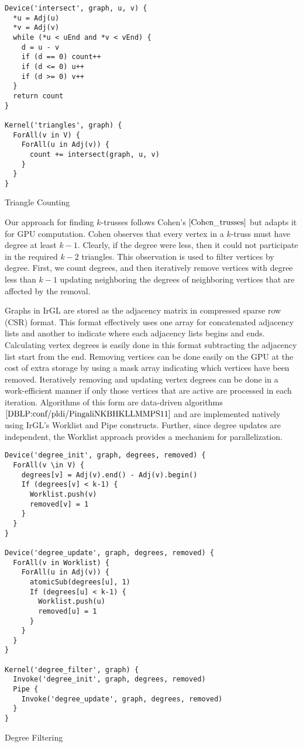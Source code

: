 \documentclass[conference]{IEEEtran}
\begin{document}
\begin{listing}
\begin{verbatim}
Device('intersect', graph, u, v) {
  *u = Adj(u)
  *v = Adj(v)
  while (*u < uEnd and *v < vEnd) {
    d = u - v
    if (d == 0) count++
    if (d <= 0) u++
    if (d >= 0) v++
  }
  return count
}

Kernel('triangles', graph) {
  ForAll(v in V) {
    ForAll(u in Adj(v)) {
      count += intersect(graph, u, v)
    }
  }
}
\end{verbatim}
\caption{Triangle Counting}
\label{l:tri_irgl}
\end{listing}

Our approach for finding $k$-trusses follows Cohen's $\cite{Cohen_trusses}$ but adapts it for GPU computation. Cohen observes that every vertex in a $k$-truss must have degree at least $k-1$. Clearly, if the degree were less, then it could not participate in the required $k-2$ triangles. This observation is used to filter vertices by degree. First, we count degrees, and then iteratively remove vertices with degree less than $k-1$ updating neighboring the degrees of neighboring vertices that are affected by the removal.

Graphs in IrGL are stored as the adjacency matrix in compressed sparse row (CSR) format. This format effectively uses one array for concatenated adjacency lists and another to indicate where each adjacency lists begins and ends. Calculating vertex degrees is easily done in this format subtracting the adjacency list start from the end. Removing vertices can be done easily on the GPU at the cost of extra storage by using a mask array indicating which vertices have been removed. Iteratively removing and updating vertex degrees can be done in a work-efficient manner if only those vertices that are active are processed in each iteration. Algorithms of this form are data-driven algorithms $\cite{DBLP:conf/pldi/PingaliNKBHKLLMMPS11}$ and are implemented natively using IrGL's Worklist and Pipe constructs. Further, since degree updates are independent, the Worklist approach provides a mechanism for parallelization.


\begin{listing}
\begin{verbatim}
Device('degree_init', graph, degrees, removed) {
  ForAll(v \in V) {
    degrees[v] = Adj(v).end() - Adj(v).begin()
    If (degrees[v] < k-1) {
      Worklist.push(v)
      removed[v] = 1
    }
  }
}

Device('degree_update', graph, degrees, removed) {
  ForAll(v in Worklist) {
    ForAll(u in Adj(v)) {
      atomicSub(degrees[u], 1)
      If (degrees[u] < k-1) {
        Worklist.push(u)
        removed[u] = 1
      }
    }
  }
}

Kernel('degree_filter', graph) {
  Invoke('degree_init', graph, degrees, removed)
  Pipe {
    Invoke('degree_update', graph, degrees, removed)
  }
}
\end{verbatim}
\caption{Degree Filtering}
\label{l:degree_filter}
\end{listing}
\end{document}
